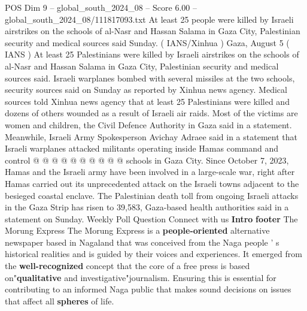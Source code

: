\begin{textsample}{POS Dim 9 – global\_south\_2024\_08 – Score 6.00 – global\_south\_2024\_08/111817093.txt}
At least 25 people were killed by Israeli airstrikes on the schools of al-Nasr and Hassan Salama in Gaza City, Palestinian security and medical sources said Sunday. ( IANS/Xinhua ) Gaza, August 5 ( IANS ) At least 25 Palestinians were killed by Israeli airstrikes on the schools of al-Nasr and Hassan Salama in Gaza City, Palestinian security and medical sources said.
Israeli warplanes bombed with several missiles at the two schools, security sources said on Sunday as reported by Xinhua news agency.
Medical sources told Xinhua news agency that at least 25 Palestinians were killed and dozens of others wounded as a result of Israeli air raids.
Most of the victims are women and children, the Civil Defence Authority in Gaza said in a statement.
Meanwhile, Israeli Army Spokesperson Avichay Adraee said in a statement that Israeli warplanes attacked militants operating inside Hamas command and control @ @ @ @ @ @ @ @ @ @ schools in Gaza City.
Since October 7, 2023, Hamas and the Israeli army have been involved in a large-scale war, right after Hamas carried out its unprecedented attack on the Israeli towns adjacent to the besieged coastal enclave.
The Palestinian death toll from ongoing Israeli attacks in the Gaza Strip has risen to 39,583, Gaza-based health authorities said in a statement on Sunday.
Weekly Poll Question Connect with us \textbf{Intro} \textbf{footer} The Morung Express The Morung Express is a \textbf{people-oriented} alternative newspaper based in Nagaland that was conceived from the Naga people ' s historical realities and is guided by their voices and experiences.
It emerged from the \textbf{well-recognized} concept that the core of a free press is based on"\textbf{qualitative} and investigative"journalism.
Ensuring this is essential for contributing to an informed Naga public that makes sound decisions on issues that affect all \textbf{spheres} of life.

\end{textsample}
